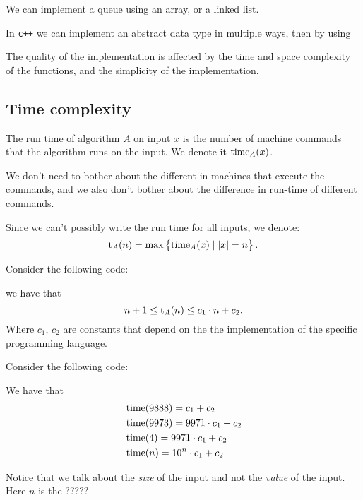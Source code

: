 \documentclass[11pt,a4paper]{article}
\begin{document}
We can implement a queue using an array, or a linked list.

In \texttt{c++} we can implement an abstract data type in multiple ways, then
by using

The quality of the implementation is affected by the time and space complexity
of the functions, and the simplicity of the implementation.

\subsection{Time complexity}

\begin{definition}
    The run time of algorithm $A$ on input $x$ is the number of machine
    commands that the algorithm runs on the input.
    We denote it $\operatorname{time}_A(x)$.
\end{definition}
\begin{remark}
    We don't need to bother about the different in machines that execute
    the commands, and we also don't bother about the difference in run-time
    of different commands.
\end{remark}

Since we can't possibly write the run time for all inputs, we denote:
\[
  \mathrm t_A(n) = \max\set{\operatorname{time}_A(x) \mid |x| = n}.
\]

\begin{example}
    Consider the following code:

    we have that
    \[
        n + 1 \le \mathrm t_A(n) \le c_1 \cdot n + c_2.
    \]
    Where $c_1$, $c_2$ are constants that depend on the the implementation
    of the specific programming language.
\end{example}

\begin{example}
    Consider the following code:

    We have that
    \begin{align*}
        &\operatorname{time}(9888) = c_1 + c_2 \\
        &\operatorname{time}(9973) = 9971 \cdot c_1 + c_2 \\
        &\operatorname{time}(4) = 9971 \cdot c_1 + c_2 \\
        &\operatorname{time}(n) = 10^n \cdot c_1 + c_2
    \end{align*}
\end{example}
\begin{remark}
    Notice that we talk about the \emph{size} of the input and not the 
    \emph{value} of the input.
    Here $n$ is the ?????
\end{remark}
\end{document}
